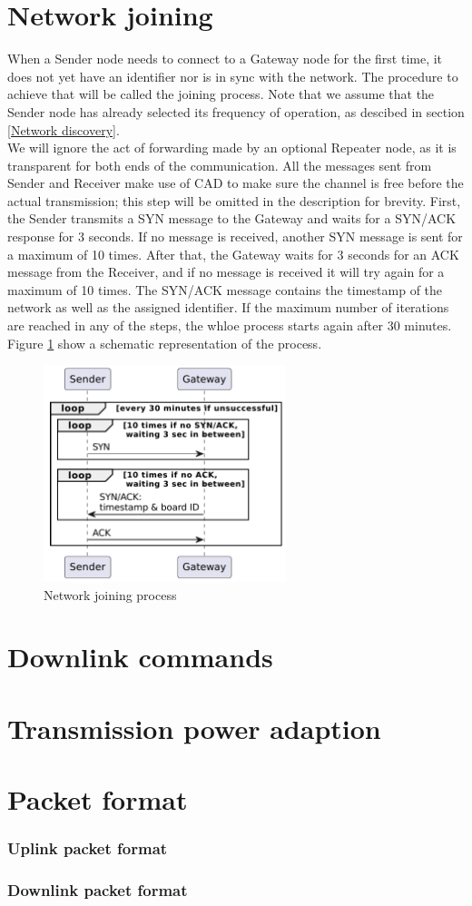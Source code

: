 \section{Network joining}
When a Sender node needs to connect to a Gateway node for the first time, it does not yet have an identifier nor is in
sync with the network. The procedure to achieve that will be called the joining process. Note that we assume that the
Sender node has already selected its frequency of operation, as descibed in section \ref{Network discovery}.\\
We will ignore the act of forwarding made by an optional Repeater node, as it is transparent for both ends of the
communication. All the messages sent from Sender and Receiver make use of CAD to make sure the channel is free before
the actual transmission; this step will be omitted in the description for brevity. First, the Sender transmits a SYN
message to the Gateway and waits for a SYN/ACK response for 3 seconds. If no message is received, another SYN message
is sent for a maximum of 10 times. After that, the Gateway waits for 3 seconds for an ACK message from the Receiver, and
if no message is received it will try again for a maximum of 10 times. The SYN/ACK message contains the timestamp of
the network as well as the assigned identifier. If the maximum number of iterations are reached in any of the steps, the
whloe process starts again after 30 minutes. Figure \ref{img: network joining} show a schematic representation of the process.

\begin{figure}[ht]
    \centering
    \includegraphics[width=200pt]{uml/network_joining.pdf}
    \caption{Network joining process}
    \label{img: network joining}
\end{figure}

\section{Downlink commands}

\section{Transmission power adaption}

\section{Packet format}

\subsubsection{Uplink packet format}

\subsubsection{Downlink packet format}
